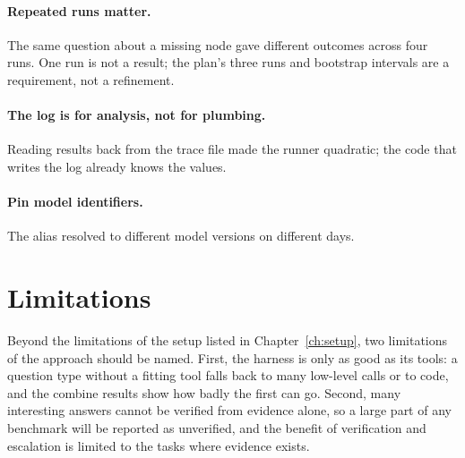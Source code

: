 \paragraph{Repeated runs matter.} The same question about a missing node gave different outcomes across four runs.
One run is not a result; the plan's three runs and bootstrap intervals are a requirement, not a refinement.

\paragraph{The log is for analysis, not for plumbing.} Reading results back from the trace file made the runner
quadratic; the code that writes the log already knows the values.

\paragraph{Pin model identifiers.} The alias  resolved to different model versions on different days.

\section{Limitations}

Beyond the limitations of the setup listed in Chapter~\ref{ch:setup}, two limitations of the approach should be
named. First, the harness is only as good as its tools: a question type without a fitting tool falls back to many
low-level calls or to code, and the combine results show how badly the first can go. Second, many interesting answers
cannot be verified from evidence alone, so a large part of any benchmark will be reported as unverified, and the
benefit of verification and escalation is limited to the tasks where evidence exists.
